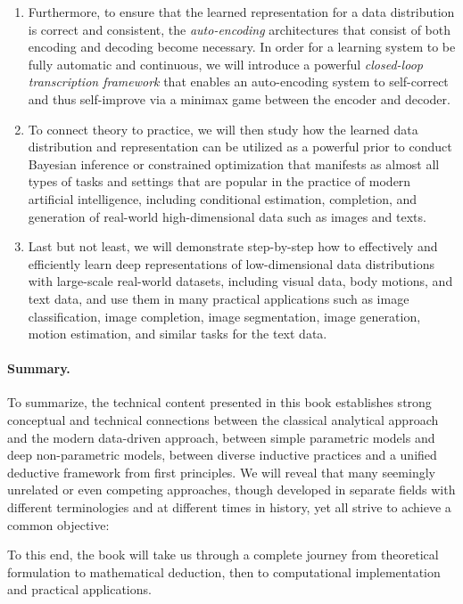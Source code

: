 \documentclass[../../book-main.tex]{subfiles}
\begin{document}
\begin{enumerate}
    \item Furthermore, to ensure that the learned representation for
        a data distribution is correct and consistent, the {\em
        auto-encoding} architectures that consist of both encoding
        and decoding become necessary. In order for a learning system
        to be fully automatic and continuous, we will introduce a
        powerful {\em closed-loop transcription framework} that
        enables an auto-encoding system to self-correct and thus
        self-improve via a minimax game between the encoder and decoder.

    \item To connect theory to practice, we will then study how the
        learned data distribution and representation can be utilized
        as a powerful prior to conduct Bayesian inference or
        constrained optimization that manifests as almost all types
        of tasks and settings that are popular in the practice of
        modern artificial intelligence, including conditional
        estimation, completion, and generation of real-world
        high-dimensional data such as images and texts.

    \item Last but not least, we will demonstrate step-by-step how to
        effectively and efficiently learn deep representations of
        low-dimensional data distributions with large-scale
        real-world datasets, including visual data, body
        motions, and text data, and use them in many practical
        applications such as image classification, image completion,
        image segmentation,
        image generation, motion estimation, and similar tasks for
        the text data.
\end{enumerate}

\paragraph{Summary.}
To summarize, the technical content presented in this book
establishes strong conceptual and technical connections between the
classical analytical approach and the modern data-driven approach,
between simple parametric models and deep non-parametric models,
between diverse inductive practices and a unified deductive framework
from first principles. We will reveal that many seemingly unrelated
or even competing approaches, though developed in separate fields
with different terminologies and at different times in history, yet
all strive to achieve a common objective:
\begin{quote}
\end{quote}
To this end, the book will take us through a complete journey from
theoretical formulation to mathematical deduction, then to
computational implementation and practical applications.
\end{document}
